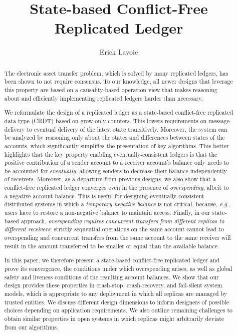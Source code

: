 \documentclass[9pt, oneside]{article}   	%
\title{State-based Conflict-Free Replicated Ledger}
\author{Erick Lavoie}
\begin{document}
\maketitle


\begin{abstract}
The electronic asset transfer problem, which is solved by many replicated ledgers, has been shown to not require consensus. To our knowledge, all newer designs that leverage this property are based on a causality-based operation view that makes reasoning about and efficiently implementing replicated ledgers harder than necessary.

We reformulate the design of a replicated ledger as a state-based conflict-free replicated data type (CRDT) based on grow-only counters. This lowers requirements on message delivery to eventual delivery of the latest state transitively. Moreover, the system can be analyzed by reasoning only about the states and differences between states of the accounts, which significantly simplifies the presentation of key algorithms. This better highlights that the key property enabling eventually-consistent ledgers is that the positive contribution of a sender account to a receiver account's balance only needs to be accounted for \textit{eventually}, allowing senders to decrease their balance independently of receivers. Moreover, as a departure from previous designs, we also show that a conflict-free replicated ledger converges even in the presence of \textit{overspending}, albeit to a negative account balance. This is useful for designing eventually-consistent distributed systems in which a \textit{temporary negative balance} is not critical, because, \textit{e.g.}, users have to restore a non-negative balance to maintain access. Finally, in our state-based approach, \textit{overspending requires concurrent transfers from different replicas to different receivers}: strictly sequential operations on the same account cannot lead to overspending and concurrent transfers from the same account to the same receiver will result in the amount transferred to be smaller or equal than the available balance.

In this paper, we therefore present a state-based conflict-free replicated ledger and prove its convergence, the conditions under which overspending arises, as well as global safety and liveness conditions of the resulting account balances. We show that our design provides these properties in crash-stop, crash-recovery, and fail-silent system models, which is appropriate to any deployment in which all replicas are managed by trusted entities. We discuss different design dimensions to inform designers of possible choices depending on application requirements. We also outline remaining challenges to obtain similar properties in open systems in which replicas might arbitrarily deviate from our algorithms.
\end{abstract}
\end{document}
